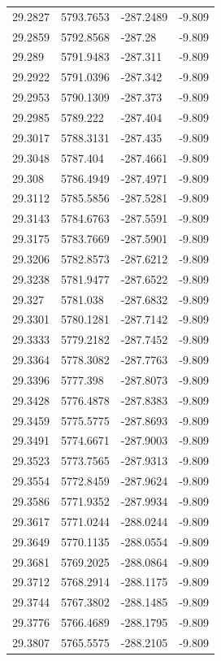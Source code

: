 \begin{table}[H]
\begin{tabular}{llll}
29.2827 & 5793.7653 & -287.2489 & -9.809 \\
29.2859 & 5792.8568 & -287.28 & -9.809 \\
29.289 & 5791.9483 & -287.311 & -9.809 \\
29.2922 & 5791.0396 & -287.342 & -9.809 \\
29.2953 & 5790.1309 & -287.373 & -9.809 \\
29.2985 & 5789.222 & -287.404 & -9.809 \\
29.3017 & 5788.3131 & -287.435 & -9.809 \\
29.3048 & 5787.404 & -287.4661 & -9.809 \\
29.308 & 5786.4949 & -287.4971 & -9.809 \\
29.3112 & 5785.5856 & -287.5281 & -9.809 \\
29.3143 & 5784.6763 & -287.5591 & -9.809 \\
29.3175 & 5783.7669 & -287.5901 & -9.809 \\
29.3206 & 5782.8573 & -287.6212 & -9.809 \\
29.3238 & 5781.9477 & -287.6522 & -9.809 \\
29.327 & 5781.038 & -287.6832 & -9.809 \\
29.3301 & 5780.1281 & -287.7142 & -9.809 \\
29.3333 & 5779.2182 & -287.7452 & -9.809 \\
29.3364 & 5778.3082 & -287.7763 & -9.809 \\
29.3396 & 5777.398 & -287.8073 & -9.809 \\
29.3428 & 5776.4878 & -287.8383 & -9.809 \\
29.3459 & 5775.5775 & -287.8693 & -9.809 \\
29.3491 & 5774.6671 & -287.9003 & -9.809 \\
29.3523 & 5773.7565 & -287.9313 & -9.809 \\
29.3554 & 5772.8459 & -287.9624 & -9.809 \\
29.3586 & 5771.9352 & -287.9934 & -9.809 \\
29.3617 & 5771.0244 & -288.0244 & -9.809 \\
29.3649 & 5770.1135 & -288.0554 & -9.809 \\
29.3681 & 5769.2025 & -288.0864 & -9.809 \\
29.3712 & 5768.2914 & -288.1175 & -9.809 \\
29.3744 & 5767.3802 & -288.1485 & -9.809 \\
29.3776 & 5766.4689 & -288.1795 & -9.809 \\
29.3807 & 5765.5575 & -288.2105 & -9.809 \\

\end{tabular}
\end{table}
